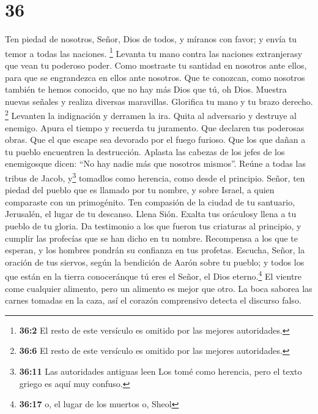 \hypertarget{section-35}{%
\section{36}\label{section-35}}

 Ten piedad de nosotros, Señor, Dios de todos, y míranos
con favor;  y envía tu temor a todas las naciones.
\footnote{\textbf{36:2} El resto de este versículo es omitido por las
  mejores autoridades.}  Levanta tu mano contra las
naciones extranjerasy que vean tu poderoso poder.  Como
mostraste tu santidad en nosotros ante ellos, para que se engrandezca en
ellos ante nosotros.  Que te conozcan, como nosotros
también te hemos conocido, que no hay más Dios que tú, oh Dios.
 Muestra nuevas señales y realiza diversas maravillas.
Glorifica tu mano y tu brazo derecho. \footnote{\textbf{36:6} El resto
  de este versículo es omitido por las mejores autoridades.}
 Levanten la indignación y derramen la ira. Quita al
adversario y destruye al enemigo.  Apura el tiempo y
recuerda tu juramento. Que declaren tus poderosas obras. 
Que el que escape sea devorado por el fuego furioso. Que los que dañan a
tu pueblo encuentren la destrucción.  Aplasta las cabezas
de los jefes de los enemigosque dicen: ``No hay nadie más que nosotros
mismos''.  Reúne a todas las tribus de Jacob,
y\footnote{\textbf{36:11} Las autoridades antiguas leen Los tomé como
  herencia, pero el texto griego es aquí muy confuso.} tomadlos como
herencia, como desde el principio.  Señor, ten piedad del
pueblo que es llamado por tu nombre, y sobre Israel, a quien comparaste
con un primogénito.  Ten compasión de la ciudad de tu
santuario, Jerusalén, el lugar de tu descanso.  Llena
Sión. Exalta tus oráculosy llena a tu pueblo de tu gloria.
 Da testimonio a los que fueron tus criaturas al
principio, y cumplir las profecías que se han dicho en tu nombre.
 Recompensa a los que te esperan, y los hombres pondrán
su confianza en tus profetas.  Escucha, Señor, la oración
de tus siervos, según la bendición de Aarón sobre tu pueblo; y todos los
que están en la tierra conoceránque tú eres el Señor, el Dios
eterno.\footnote{\textbf{36:17} o, el lugar de los muertos o, Sheol}
 El vientre come cualquier alimento, pero un alimento es
mejor que otro.  La boca saborea las carnes tomadas en la
caza, así el corazón comprensivo detecta el discurso falso.
